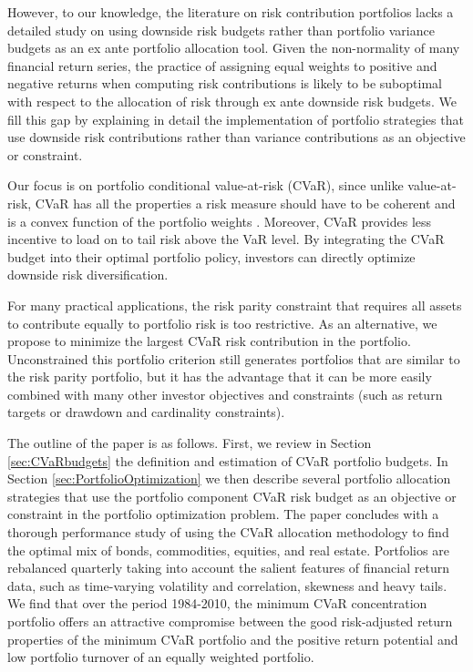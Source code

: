 \documentclass[12pt,a4paper]{article}
\begin{document}
However, to our knowledge, the literature on risk contribution portfolios lacks a detailed study on using downside risk budgets rather than portfolio variance budgets as an ex ante portfolio allocation tool. Given the non-normality of many financial return series, the practice of assigning equal weights to positive and negative returns when computing risk contributions is likely to be suboptimal with respect to the allocation of risk through ex ante downside risk budgets. We fill this gap by explaining in detail the implementation of portfolio strategies that use downside risk contributions rather than variance contributions as an objective or constraint.

Our focus is on portfolio conditional value-at-risk (CVaR), since unlike value-at-risk, CVaR has all the properties a risk measure should have to be coherent and is a convex function of the portfolio weights \citep{Artzner1999, Pflug2000}. Moreover, CVaR provides less incentive to load on to tail risk above the VaR level. By integrating the CVaR budget into their optimal portfolio policy, investors can directly optimize downside risk diversification.

For many practical applications, the risk parity constraint that requires all assets to contribute equally to portfolio risk is too restrictive. As an alternative, we propose to minimize the largest CVaR risk contribution in the portfolio. Unconstrained this portfolio criterion still  generates portfolios that are similar to the risk parity portfolio, but it has the advantage that it can be more easily combined with many other investor objectives and constraints (such as return targets or drawdown and cardinality constraints).

 The outline of the paper is as follows. First, we review in Section \ref{sec:CVaRbudgets} the definition and estimation of CVaR portfolio budgets. In Section \ref{sec:PortfolioOptimization} we then describe several portfolio allocation strategies that use the portfolio component CVaR risk budget as an objective or constraint in the portfolio optimization problem. The paper concludes with a thorough performance study of
 using the CVaR allocation methodology to find the optimal mix of bonds, commodities, equities, and real estate. Portfolios are rebalanced quarterly taking into account the salient features of financial return data, such as time-varying volatility and correlation, skewness and heavy tails. We find that over the period 1984-2010, the minimum CVaR concentration portfolio offers an attractive compromise between the good risk-adjusted return properties of the minimum CVaR portfolio and the positive return potential and low portfolio turnover of an equally weighted portfolio.
\end{document}

